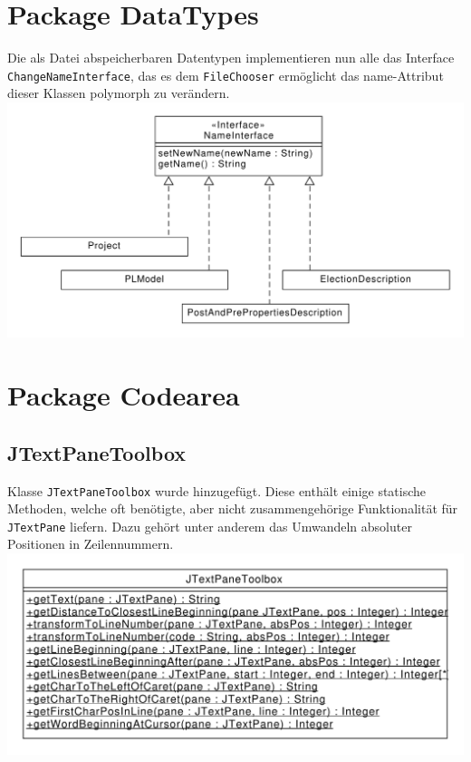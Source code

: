 \documentclass[a4paper]{scrreprt}
\begin{document}
\section{Package DataTypes}
Die als Datei abspeicherbaren Datentypen implementieren nun alle das Interface \\ \verb!ChangeNameInterface!, das es dem \verb!FileChooser! ermöglicht das name-Attribut dieser Klassen polymorph zu verändern.\\
\includegraphics[scale=0.5]{NameInterface.pdf}


\section{Package Codearea}
\subsection{JTextPaneToolbox}
Klasse \verb!JTextPaneToolbox! wurde hinzugefügt. Diese enthält einige statische Methoden, welche oft benötigte, aber nicht zusammengehörige Funktionalität für \verb!JTextPane! liefern. Dazu gehört unter anderem das Umwandeln absoluter Positionen in Zeilennummern.\\
\includegraphics[scale=0.5]{JTextPaneToolbox.pdf}\\
\end{document}

